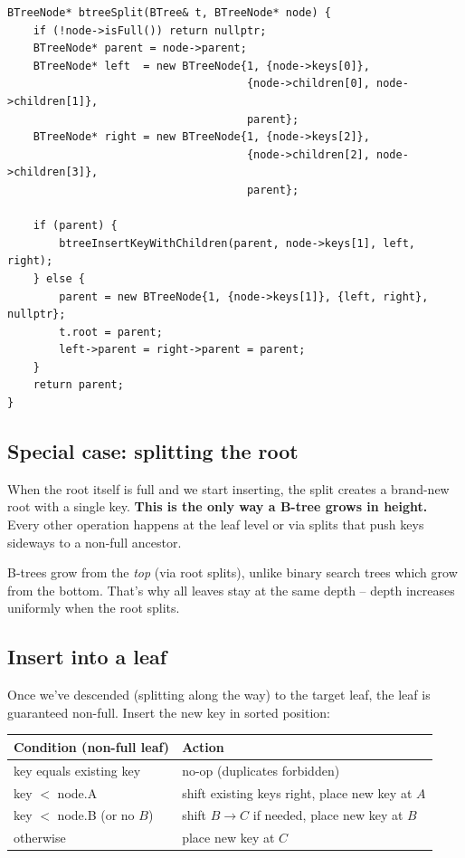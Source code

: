 \documentclass[11pt]{article}
\begin{document}
\begin{lstlisting}[basicstyle=\ttfamily\small,frame=single]
BTreeNode* btreeSplit(BTree& t, BTreeNode* node) {
    if (!node->isFull()) return nullptr;
    BTreeNode* parent = node->parent;
    BTreeNode* left  = new BTreeNode{1, {node->keys[0]},
                                     {node->children[0], node->children[1]},
                                     parent};
    BTreeNode* right = new BTreeNode{1, {node->keys[2]},
                                     {node->children[2], node->children[3]},
                                     parent};

    if (parent) {
        btreeInsertKeyWithChildren(parent, node->keys[1], left, right);
    } else {
        parent = new BTreeNode{1, {node->keys[1]}, {left, right}, nullptr};
        t.root = parent;
        left->parent = right->parent = parent;
    }
    return parent;
}
\end{lstlisting}

\subsection*{Special case: splitting the root}

When the root itself is full and we start inserting, the split creates a brand-new root with a single key. \textbf{This is the only way a B-tree grows in height.} Every other operation happens at the leaf level or via splits that push keys sideways to a non-full ancestor.

\begin{ideabox}
B-trees grow from the \emph{top} (via root splits), unlike binary search trees which grow from the bottom. That's why all leaves stay at the same depth -- depth increases uniformly when the root splits.
\end{ideabox}

\subsection*{Insert into a leaf}

Once we've descended (splitting along the way) to the target leaf, the leaf is guaranteed non-full. Insert the new key in sorted position:

\begin{center}
\begin{tabular}{ll}
\hline
Condition (non-full leaf) & Action \\
\hline
key equals existing key & no-op (duplicates forbidden) \\
key $<$ node.A & shift existing keys right, place new key at $A$ \\
key $<$ node.B (or no $B$) & shift $B \to C$ if needed, place new key at $B$ \\
otherwise & place new key at $C$ \\
\hline
\end{tabular}
\end{center}
\end{document}
